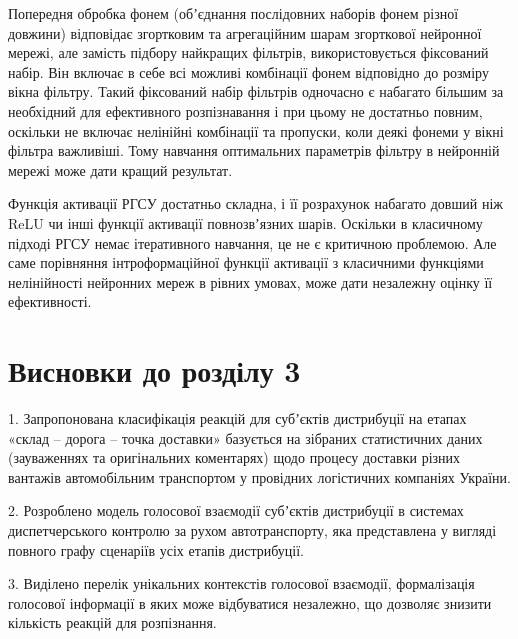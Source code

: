 Попередня обробка фонем (обʼєднання послідовних наборів фонем різної довжини) відповідає згортковим та агрегаційним шарам згорткової нейронної мережі, але замість підбору найкращих фільтрів, використовується фіксований набір. Він включає в себе всі можливі комбінації фонем відповідно до розміру вікна фільтру. Такий фіксований набір фільтрів одночасно є набагато більшим за необхідний для ефективного розпізнавання і при цьому не достатньо повним, оскільки не включає нелінійні комбінації та пропуски, коли деякі фонеми у вікні фільтра важливіші. Тому навчання оптимальних параметрів фільтру в нейронній мережі може дати кращий результат.

Функція активації РГСУ достатньо складна, і її розрахунок набагато довший ніж ReLU чи інші функції активації  повнозвʼязних шарів. Оскільки в класичному підході РГСУ немає ітеративного навчання, це не є критичною проблемою. Але саме порівняння інтроформаційної функції активації з класичними функціями нелінійності нейронних мереж в рівних умовах, може дати незалежну оцінку її ефективності. 

\section*{Висновки до розділу 3}

1. Запропонована класифікація реакцій для субʼєктів дистрибуції на етапах «склад – дорога – точка доставки» базується на зібраних статистичних даних (зауваженнях та оригінальних коментарях) щодо процесу доставки різних вантажів автомобільним транспортом у провідних логістичних компаніях України.


2. Розроблено модель голосової взаємодії субʼєктів дистрибуції в системах диспетчерського контролю за рухом автотранспорту, яка представлена у вигляді повного графу сценаріїв усіх етапів дистрибуції. 

3. Виділено перелік унікальних контекстів голосової взаємодії, формалізація голосової інформації в яких може відбуватися незалежно, що дозволяє знизити кількість реакцій для розпізнання.

